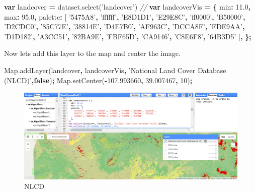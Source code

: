 \documentclass[]{article}
\newenvironment{Shaded}{\begin{snugshade}}{\end{snugshade}}
\newcommand{\KeywordTok}[1]{\textcolor[rgb]{0.13,0.29,0.53}{\textbf{#1}}}
\newcommand{\DataTypeTok}[1]{\textcolor[rgb]{0.13,0.29,0.53}{#1}}
\newcommand{\DecValTok}[1]{\textcolor[rgb]{0.00,0.00,0.81}{#1}}
\newcommand{\FloatTok}[1]{\textcolor[rgb]{0.00,0.00,0.81}{#1}}
\newcommand{\StringTok}[1]{\textcolor[rgb]{0.31,0.60,0.02}{#1}}
\newcommand{\CommentTok}[1]{\textcolor[rgb]{0.56,0.35,0.01}{\textit{#1}}}
\newcommand{\VariableTok}[1]{\textcolor[rgb]{0.00,0.00,0.00}{#1}}
\newcommand{\OperatorTok}[1]{\textcolor[rgb]{0.81,0.36,0.00}{\textbf{#1}}}
\newcommand{\AttributeTok}[1]{\textcolor[rgb]{0.77,0.63,0.00}{#1}}
\newcommand{\NormalTok}[1]{#1}
\begin{document}
\begin{Shaded}
\begin{Highlighting}[]

\KeywordTok{var}\NormalTok{ landcover }\OperatorTok{=} \VariableTok{dataset}\NormalTok{.}\AttributeTok{select}\NormalTok{(}\StringTok{'landcover'}\NormalTok{)}
\CommentTok{//}
\KeywordTok{var}\NormalTok{ landcoverVis }\OperatorTok{=} \OperatorTok{\{}
  \DataTypeTok{min}\OperatorTok{:} \FloatTok{11.0}\OperatorTok{,}
  \DataTypeTok{max}\OperatorTok{:} \FloatTok{95.0}\OperatorTok{,}
  \DataTypeTok{palette}\OperatorTok{:}\NormalTok{ [}
    \StringTok{'5475A8'}\OperatorTok{,} \StringTok{'ffffff'}\OperatorTok{,} \StringTok{'E8D1D1'}\OperatorTok{,} \StringTok{'E29E8C'}\OperatorTok{,} \StringTok{'ff0000'}\OperatorTok{,} \StringTok{'B50000'}\OperatorTok{,} \StringTok{'D2CDC0'}\OperatorTok{,}
    \StringTok{'85C77E'}\OperatorTok{,} \StringTok{'38814E'}\OperatorTok{,} \StringTok{'D4E7B0'}\OperatorTok{,} \StringTok{'AF963C'}\OperatorTok{,} \StringTok{'DCCA8F'}\OperatorTok{,} \StringTok{'FDE9AA'}\OperatorTok{,} \StringTok{'D1D182'}\OperatorTok{,}
    \StringTok{'A3CC51'}\OperatorTok{,} \StringTok{'82BA9E'}\OperatorTok{,} \StringTok{'FBF65D'}\OperatorTok{,} \StringTok{'CA9146'}\OperatorTok{,} \StringTok{'C8E6F8'}\OperatorTok{,} \StringTok{'64B3D5'}
\NormalTok{  ]}\OperatorTok{,}
\OperatorTok{\};}
\end{Highlighting}
\end{Shaded}

Now lets add this layer to the map and center the image.

\begin{Shaded}
\begin{Highlighting}[]

\VariableTok{Map}\NormalTok{.}\AttributeTok{addLayer}\NormalTok{(landcover}\OperatorTok{,}\NormalTok{ landcoverVis}\OperatorTok{,} \StringTok{'National Land Cover Database (NLCD)'}\OperatorTok{,}\KeywordTok{false}\NormalTok{)}\OperatorTok{;}
\VariableTok{Map}\NormalTok{.}\AttributeTok{setCenter}\NormalTok{(}\OperatorTok{-}\FloatTok{107.993660}\OperatorTok{,} \FloatTok{39.007467}\OperatorTok{,} \DecValTok{10}\NormalTok{)}\OperatorTok{;}
\end{Highlighting}
\end{Shaded}

\begin{figure}
\centering
\includegraphics{NLCD_ScreenShot.png}
\caption{NLCD}
\end{figure}
\end{document}
